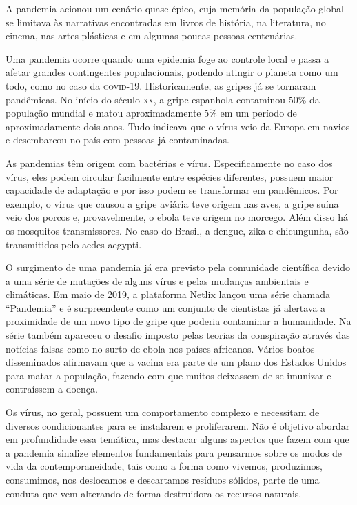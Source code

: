 A pandemia acionou um cenário quase épico, cuja memória da população
global se limitava às narrativas encontradas em livros de história, na
literatura, no cinema, nas artes plásticas e em algumas poucas pessoas
centenárias.

Uma pandemia ocorre quando uma epidemia foge ao controle local e passa a
afetar grandes contingentes populacionais, podendo atingir o planeta
como um todo, como no caso da \textsc{covid-19}. Historicamente, as gripes já se
tornaram pandêmicas. No início do século \textsc{xx}, a gripe espanhola
contaminou 50\% da população mundial e matou aproximadamente 5\% em um
período de aproximadamente dois anos. Tudo indicava que o vírus veio da
Europa em navios e desembarcou no país com pessoas já contaminadas.

As pandemias têm origem com bactérias e vírus. Especificamente
no caso dos vírus, eles podem circular facilmente entre espécies
diferentes, possuem maior capacidade de adaptação e por isso podem se
transformar em pandêmicos. Por exemplo, o vírus que causou a gripe
aviária teve origem nas aves, a gripe suína veio dos porcos e,
provavelmente, o ebola teve origem no morcego. Além disso há os
mosquitos transmissores. No caso do Brasil, a dengue, zika e
chicungunha, são transmitidos pelo aedes aegypti.

O surgimento de uma pandemia já era previsto pela comunidade científica
devido a uma série de mutações de alguns vírus e pelas mudanças
ambientais e climáticas. Em maio de 2019, a plataforma Netlix lançou uma
série chamada ``Pandemia'' e é surpreendente como um conjunto de
cientistas já alertava a proximidade de um novo tipo de gripe que
poderia contaminar a humanidade. Na série também apareceu o desafio
imposto pelas teorias da conspiração através das notícias falsas como no
surto de ebola nos países africanos. Vários boatos disseminados
afirmavam que a vacina era parte de um plano dos Estados Unidos para
matar a população, fazendo com que muitos deixassem de se imunizar e
contraíssem a doença.

Os vírus, no geral, possuem um comportamento complexo e necessitam de
diversos condicionantes para se instalarem e proliferarem. Não é
objetivo abordar em profundidade essa temática, mas destacar alguns
aspectos que fazem com que a pandemia sinalize elementos fundamentais
para pensarmos sobre os modos de vida da contemporaneidade, tais como a
forma como vivemos, produzimos, consumimos, nos deslocamos e descartamos
resíduos sólidos, parte de uma conduta que vem alterando de forma
destruidora os recursos naturais.

